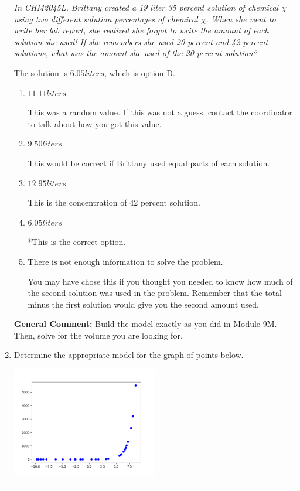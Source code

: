 \documentclass{extbook}[14pt]
\newcommand{\litem}[1]{\item #1

\rule{\textwidth}{0.4pt}}
\begin{document}
\begin{enumerate}
{\begin{center}
    \textit{ In CHM2045L, Brittany created a 19 liter 35 percent solution of chemical $\chi$ using two different solution percentages of chemical $\chi$. When she went to write her lab report, she realized she forgot to write the amount of each solution she used! If she remembers she used 20 percent and 42 percent solutions, what was the amount she used of the 20 percent solution? }
\end{center}
The solution is \( 6.05 liters \), which is option D.\begin{enumerate}[label=\Alph*.]
\item \( 11.11 liters \)

This was a random value. If this was not a guess, contact the coordinator to talk about how you got this value.
\item \( 9.50 liters \)

This would be correct if Brittany used equal parts of each solution.
\item \( 12.95 liters \)

This is the concentration of 42 percent solution.
\item \( 6.05 liters \)

*This is the correct option.
\item \( \text{There is not enough information to solve the problem.} \)

You may have chose this if you thought you needed to know how much of the second solution was used in the problem. Remember that the total minus the first solution would give you the second amount used.
\end{enumerate}

\textbf{General Comment:} Build the model exactly as you did in Module 9M. Then, solve for the volume you are looking for.
}
\litem{
Determine the appropriate model for the graph of points below.

\begin{center}
    \includegraphics[width=0.5\textwidth]{../Figures/identifyModelGraph12CopyA.png}
\end{center}


}
\end{enumerate}
\end{document}
